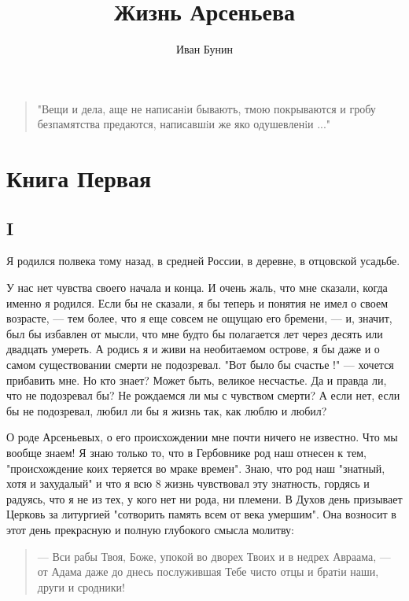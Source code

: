 \documentclass[12pt,russian]{article}
\begin{document}
\title{Жизнь Арсеньева}
\author{Иван Бунин}
\maketitle

\begin{quotation}
"Вещи и дела,  аще  не  написанiи  бываютъ,  тмою  покрываются и  гробу безпамятства предаются, написавшiи же яко одушевленiи ..."
\end{quotation}

\section{Книга Первая}

\subsection{I}

Я родился полвека тому назад, в средней России,  в деревне, в отцовской усадьбе. 

У нас нет чувства своего начала и конца. И очень жаль, что мне сказали, когда именно я родился. Если бы не сказали, я  бы теперь и понятия не имел о  своем  возрасте, \cdash--- тем более, что я еще совсем не ощущаю его бремени, \cdash--- и, значит,  был  бы избавлен от  мысли,  что мне будто бы полагается лет  через десять или двадцать умереть. А родись я и живи на необитаемом  острове, я бы даже и о самом  существовании смерти не подозревал. "Вот было бы счастье  !" \cdash--- хочется прибавить мне. Но кто  знает? Может быть, великое несчастье. Да и правда  ли,  что  не подозревал бы? Не рождаемся ли  мы с чувством смерти? А если нет, если бы не подозревал, любил ли бы я жизнь так, как люблю и любил?

О роде  Арсеньевых, о его происхождении мне почти ничего  не  известно. Что  мы вообще знаем! Я  знаю только то, что в Гербовнике род наш  отнесен к тем,  "происхождение  коих теряется  во  мраке  времен".  Знаю, что  род наш "знатный, хотя и захудалый" и что я всю {8} жизнь чувствовал эту  знатность, гордясь и радуясь, что я не из тех, у кого  нет ни рода, ни племени. В Духов день призывает Церковь за литургией "сотворить память всем от века умершим". Она возносит в этот день прекрасную и полную глубокого смысла молитву:

\begin{quotation}
     \cdash--- Вси рабы Твоя,  Боже,  упокой во дворех Твоих и в недрех Авраама, \cdash--- от  Адама даже до  днесь послужившая Тебе чисто отцы и  братiи наши, други и сродники!
\end{quotation}
\end{document}
